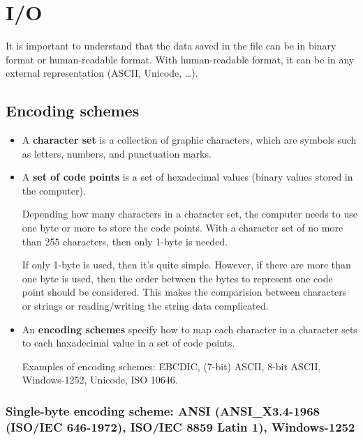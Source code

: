 \chapter{I/O}
\label{chap:IO}

It is important to understand that the data saved in the file can be in binary
format or human-readable format. With human-readable format, it can be in any
external representation (ASCII, Unicode, \ldots).

 
\section{Encoding schemes}
\label{sec:character_sets}
\label{sec:encoding-scheme}

\begin{itemize}

  \item A {\bf character set} is a collection of graphic characters, which are
  symbols such as letters, numbers, and punctuation marks. 
  
  \item A {\bf set of code points} is a set of hexadecimal values (binary values
  stored in the computer). 
  
  Depending how many characters in a character set, the computer needs to use
  one byte or more to store the code points. With a character set of no more
  than 255 characters, then only 1-byte is needed.
  
  If only 1-byte is used, then it's quite simple. However, if there are more
  than one byte is used, then the order between the bytes to represent one code
  point should be considered. This makes the comparision between characters or
  strings or reading/writing the string data complicated.

  \item  An {\bf encoding schemes} specify how to map each character in a
  character sets to each haxadecimal value in a set of code points.

Examples of encoding schemes: EBCDIC, (7-bit) ASCII, 8-bit ASCII, Windows-1252,
Unicode, ISO 10646.

\end{itemize}

\subsection{Single-byte encoding scheme: ANSI (ANSI\_X3.4-1968 (ISO/IEC
646-1972), ISO/IEC 8859 Latin 1), Windows-1252}
\label{sec:ANSI}

